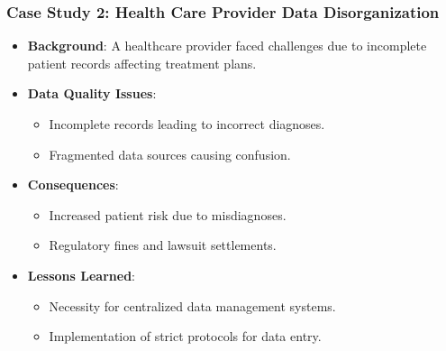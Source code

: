 \documentclass{beamer}
\begin{document}
\begin{frame}[fragile]
    \frametitle{Case Study 2: Health Care Provider Data Disorganization}
    \begin{itemize}
        \item \textbf{Background}: A healthcare provider faced challenges due to incomplete patient records affecting treatment plans.
        \item \textbf{Data Quality Issues}:
            \begin{itemize}
                \item Incomplete records leading to incorrect diagnoses.
                \item Fragmented data sources causing confusion.
            \end{itemize}
        \item \textbf{Consequences}:
            \begin{itemize}
                \item Increased patient risk due to misdiagnoses.
                \item Regulatory fines and lawsuit settlements.
            \end{itemize}
        \item \textbf{Lessons Learned}:
            \begin{itemize}
                \item Necessity for centralized data management systems.
                \item Implementation of strict protocols for data entry.
            \end{itemize}
    \end{itemize}
\end{frame}
\end{document}
